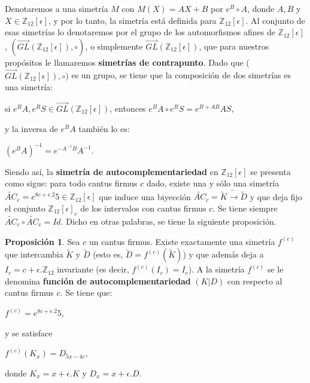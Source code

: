 \documentclass[letterpaper,12pt]{book}
\theoremstyle{definition} \newtheorem{Def}{Definición}[chapter]
\theoremstyle{definition} \newtheorem{Teo}{Teorema}[chapter]
\theoremstyle{definition} \newtheorem{Pro}{Proposición}[chapter]
\theoremstyle{definition} \newtheorem{Lema}{Lema}[chapter]
\begin{document}
 Denotaremos a una simetría $M$ con $M(X)=AX+B$ por $e^B\circ A$, donde $A,B$ y $X \in \mathbb{Z}_{12}[\epsilon]$, y por lo tanto, la simetría está definida para $\mathbb{Z}_{12}[\epsilon]$.  Al conjunto de esas simetrías lo denotaremos por el grupo de los automorfismos afines de $\mathbb{Z}_{12}[\epsilon]$, $(\overrightarrow{GL}(\mathbb{Z}_{12}[\epsilon]),\circ)$, o simplemente $\overrightarrow{GL}(\mathbb{Z}_{12}[\epsilon])$,  que para nuestros propósitos le llamaremos \textbf{simetrías de contrapunto}. Dado que ($\overrightarrow{GL}(\mathbb{Z}_{12}[\epsilon]),\circ)$ es un grupo, se tiene que la composición de dos simetrías es una simetría:
 
\begin{description} 
\centering
\item si $e^BA,  e^RS \in \overrightarrow{GL}(\mathbb{Z}_{12}[\epsilon])$, entonces $e^BA \circ e^RS=e^{B+AR}AS$, 
\end{description} 
y la inversa de $e^BA$ también lo es:
\begin{description} 
\centering
\item $(e^BA)^{-1}=e^{-A^{-1}B}A^{-1}$.
\end{description} 

Siendo así, la \textbf{simetría de autocomplementariedad} en $\mathbb{Z}_{12}[\epsilon]$ se presenta como sigue: para todo cantus firmus $c$ dado, existe una y sólo una simetría  $\widetilde{AC}_c=e^{8c+\epsilon.2}5\in\mathbb{Z}_{12}[\epsilon]$  que induce una biyección $\widetilde{AC}_c=\tilde K \tilde{\to}\tilde D$ y que deja fijo el conjunto $\mathbb{Z}_{12}[\epsilon]_c$ de los intervalos con cantus firmus $c$. Se tiene siempre $\widetilde{AC}_c \circ \widetilde{AC}_c=Id$. Dicho en otras palabras, se tiene la siguiente proposición.

\begin{Pro}
Sea $c$ un cantus firmus. Existe exactamente una simetría $f^{(c)}$ que intercambia $\tilde{K}$ y $\tilde{D}$ (esto es, $\tilde{D}=f^{(c)}(\tilde{K})$) y  que además deja a $I_c=c+\epsilon.\mathbb{Z}_{12}$ invariante (es decir, $f^{(c)}(I_c)=I_c$). A la simetría $f^{(c)}$ se le denomina \textbf{función de autocomplementariedad} $(K|D)$ con respecto al cantus firmus $c$. Se tiene que:
\begin{description}
\centering
\item $f^{(c)}=e^{8c+\epsilon.2}5$,
\end{description}
y se satisface
\begin{description}
\centering 
\item $f^{(c)}(K_x)=D_{5x-4c}$,
\end{description}
donde $K_x=x+\epsilon.K$ y $D_x=x+\epsilon.D$.
\end{Pro}
\end{document}

